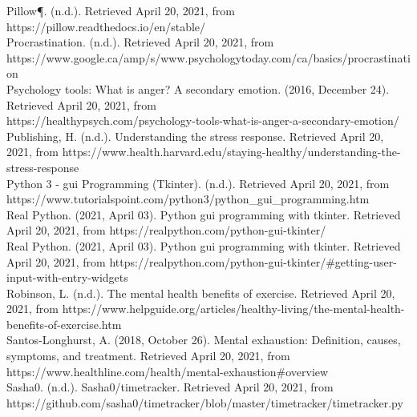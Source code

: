 \documentclass{article}
\begin{document}
    Pillow¶. (n.d.). Retrieved April 20, 2021, from \\https://pillow.readthedocs.io/en/stable/ \\

    Procrastination. (n.d.). Retrieved April 20, 2021, from \\https://www.google.ca/amp/s/www.psychologytoday.com/ca/basics/procrastination \\

    Psychology tools: What is anger? A secondary emotion. (2016, December 24). Retrieved April 20, 2021, from \\ https://healthypsych.com/psychology-tools-what-is-anger-a-secondary-emotion/ \\

    Publishing, H. (n.d.). Understanding the stress response. Retrieved April 20, 2021, from https://www.health.harvard.edu/staying-healthy/understanding-the-stress-response \\

    Python 3 - gui Programming (Tkinter). (n.d.). Retrieved April 20, 2021, from \\https://www.tutorialspoint.com/python3/python\_gui_programming.htm \\

    Real Python. (2021, April 03). Python gui programming with tkinter. Retrieved April 20, 2021, from https://realpython.com/python-gui-tkinter/ \\

    Real Python. (2021, April 03). Python gui programming with tkinter. Retrieved April 20, 2021, from https://realpython.com/python-gui-tkinter/#getting-user-input-with-entry-widgets \\

    Robinson, L. (n.d.). The mental health benefits of exercise. Retrieved April 20, 2021, from https://www.helpguide.org/articles/healthy-living/the-mental-health-benefits-of-exercise.htm \\

    Santos-Longhurst, A. (2018, October 26). Mental exhaustion: Definition, causes, symptoms, and treatment. Retrieved April 20, 2021, from \\ https://www.healthline.com/health/mental-exhaustion#overview \\

    Sasha0. (n.d.). Sasha0/timetracker. Retrieved April 20, 2021, from \\https://github.com/sasha0/timetracker/blob/master/timetracker/timetracker.py \\
\end{document}
